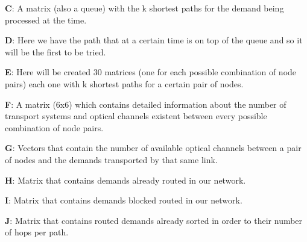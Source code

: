 \textbf{C}: A matrix (also a queue) with the k shortest paths for the demand being processed at the time.

\textbf{D}: Here we have the path that at a certain time is on top of the queue and so it will be the first to be tried.

\textbf{E}: Here will be created 30 matrices (one for each possible combination of node pairs) each one with k shortest paths for a certain pair of nodes.

\textbf{F}: A matrix (6x6) which contains detailed information about the number of transport systems and optical channels existent between every possible combination of node pairs.

\textbf{G}: Vectors that contain the number of available optical channels between a pair of nodes and the demands transported by that same link.

\textbf{H}: Matrix that contains demands already routed in our network.

\textbf{I}: Matrix that contains demands blocked routed in our network.

\textbf{J}: Matrix that contains routed demands already sorted in order to their number of hops per path.

